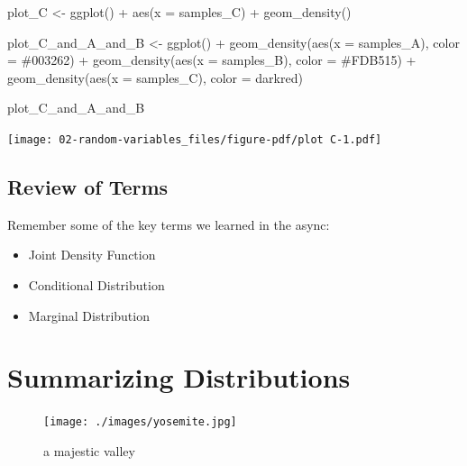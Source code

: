 \documentclass[
  letterpaper,
  DIV=11,
  numbers=noendperiod]{scrreprt}
\newenvironment{Shaded}{\begin{snugshade}}{\end{snugshade}}
\newcommand{\AttributeTok}[1]{\textcolor[rgb]{0.40,0.45,0.13}{#1}}
\newcommand{\FunctionTok}[1]{\textcolor[rgb]{0.28,0.35,0.67}{#1}}
\newcommand{\NormalTok}[1]{\textcolor[rgb]{0.00,0.23,0.31}{#1}}
\newcommand{\OtherTok}[1]{\textcolor[rgb]{0.00,0.23,0.31}{#1}}
\newcommand{\SpecialCharTok}[1]{\textcolor[rgb]{0.37,0.37,0.37}{#1}}
\newcommand{\StringTok}[1]{\textcolor[rgb]{0.13,0.47,0.30}{#1}}
\providecommand{\tightlist}{%
  \setlength{\itemsep}{0pt}\setlength{\parskip}{0pt}}\usepackage{longtable,booktabs,array}
\begin{document}
\begin{Shaded}
\begin{Highlighting}[]
\NormalTok{plot\_C }\OtherTok{\textless{}{-}} \FunctionTok{ggplot}\NormalTok{() }\SpecialCharTok{+} 
  \FunctionTok{aes}\NormalTok{(}\AttributeTok{x =}\NormalTok{ samples\_C) }\SpecialCharTok{+} 
  \FunctionTok{geom\_density}\NormalTok{()}

\NormalTok{plot\_C\_and\_A\_and\_B }\OtherTok{\textless{}{-}} \FunctionTok{ggplot}\NormalTok{()   }\SpecialCharTok{+} 
  \FunctionTok{geom\_density}\NormalTok{(}\FunctionTok{aes}\NormalTok{(}\AttributeTok{x =}\NormalTok{ samples\_A), }\AttributeTok{color =} \StringTok{\textquotesingle{}\#003262\textquotesingle{}}\NormalTok{) }\SpecialCharTok{+} 
  \FunctionTok{geom\_density}\NormalTok{(}\FunctionTok{aes}\NormalTok{(}\AttributeTok{x =}\NormalTok{ samples\_B), }\AttributeTok{color =} \StringTok{\textquotesingle{}\#FDB515\textquotesingle{}}\NormalTok{) }\SpecialCharTok{+} 
  \FunctionTok{geom\_density}\NormalTok{(}\FunctionTok{aes}\NormalTok{(}\AttributeTok{x =}\NormalTok{ samples\_C), }\AttributeTok{color =} \StringTok{\textquotesingle{}darkred\textquotesingle{}}\NormalTok{)}

\NormalTok{plot\_C\_and\_A\_and\_B}
\end{Highlighting}
\end{Shaded}

\texttt{[image: 02-random-variables\_files/figure-pdf/plot C-1.pdf]}

\section{Review of Terms}\label{review-of-terms}

Remember some of the key terms we learned in the async:

\begin{itemize}
\tightlist
\item
  Joint Density Function
\item
  Conditional Distribution
\item
  Marginal Distribution
\end{itemize}

\chapter{Summarizing Distributions}\label{summarizing-distributions}

\begin{figure}[H]

{\centering \texttt{[image: ./images/yosemite.jpg]}

}

\caption{a majestic valley}

\end{figure}%
\end{document}
